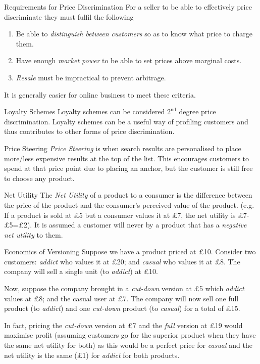 \documentclass[11pt,a4paper]{article}
\begin{document}
\begin{proposition}{Requirements for Price Discrimination}
  For a seller to be able to effectively price discriminate they must fulfil the following
  \begin{enumerate}
    \item Be able to \textit{distinguish between customers} so as to know what price to charge them.
    \item Have enough \textit{market power} to be able to set prices above marginal costs.
    \item \textit{Resale} must be impractical to prevent arbitrage.
  \end{enumerate}
  It is generally easier for online business to meet these criteria.
\end{proposition}

\begin{remark}{Loyalty Schemes}
  Loyalty schemes can be considered $2^\text{nd}$ degree price discrimination. Loyalty schemes can be a useful way of profiling customers and thus contributes to other forms of price discrimination.
\end{remark}

\begin{definition}{Price Steering}
  \textit{Price Steering} is when search results are personalised to place more/less expensive results at the top of the list. This encourages customers to spend at that price point due to placing an anchor, but the customer is still free to choose any product.
\end{definition}

\begin{definition}{Net Utility}
  The \textit{Net Utility} of a product to a consumer is the difference between the price of the product and the consumer's perceived value of the product. (e.g. If a product is sold at £5 but a consumer values it at £7, the net utility is £7-£5=£2). It is assumed a customer will never by a product that has a \textit{negative net utility} to them.
\end{definition}

\begin{example}{Economics of Versioning}
  Suppose we have a product priced at £10. Consider two customers: \textit{addict} who values it at £20; and \textit{casual} who values it at £8. The company will sell a single unit (to \textit{addict}) at £10.
  \par Now, suppose the company brought in a \textit{cut-down} version at £5 which \textit{addict} values at £8; and the casual user at £7. The company will now sell one full product (to \textit{addict}) and one \textit{cut-down} product (to \textit{casual}) for a total of £15.
  \par In fact, pricing the \textit{cut-down} version at £7 and the \textit{full} version at £19 would maximise profit (assuming customers go for the superior product when they have the same net utility for both) as this would be a perfect price for  \textit{casual} and the net utility is the same (£1) for \textit{addict} for both products.
\end{example}
\end{document}

